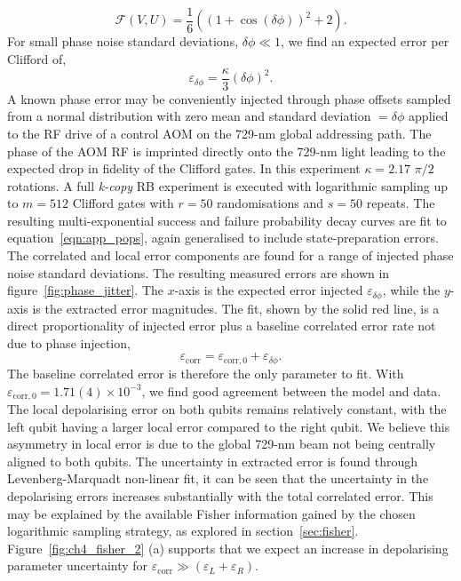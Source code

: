 \begin{equation}
    \mathcal{F}(V,U) = \frac{1}{6} \left( \left(1+\cos\left(\delta\phi\right)\right)^2 + 2 \right).
\end{equation}
For small phase noise standard deviations, $\delta\phi \ll 1$, we find an expected error per Clifford of,
\begin{equation}
\varepsilon_{\delta\phi} = \frac{\kappa}{3}(\delta\phi)^2.
\end{equation}
A known phase error may be conveniently injected through phase offsets sampled from a normal distribution with zero mean and standard deviation $=\delta\phi$ applied to the RF drive of a control AOM on the 729-nm global addressing path. The phase of the AOM RF is imprinted directly onto the 729-nm light leading to the expected drop in fidelity of the Clifford gates.
In this experiment $\kappa=2.17$ $\pi/2$ rotations. A full \emph{k-copy} RB experiment is executed with logarithmic sampling up to $m=512$ Clifford gates with $r=50$ randomisations and $s=50$ repeats. The resulting multi-exponential success and failure probability decay curves are fit to equation~\ref{eqn:app_pops}, again generalised to include state-preparation errors.  The correlated and local error components are found for a range of injected phase noise standard deviations. The resulting measured errors are shown in figure~\ref{fig:phase_jitter}. The $x$-axis is the expected error injected $\varepsilon_{\delta\phi}$, while the $y$-axis is the extracted error magnitudes. The fit, shown by the solid red line, is a direct proportionality of injected error plus a baseline correlated error rate not due to phase injection,
\begin{equation}
\varepsilon_\mathrm{corr} = \varepsilon_\mathrm{corr,0} + \varepsilon_{\delta\phi}.
\end{equation}
The baseline correlated error is therefore the only parameter to fit. With $\varepsilon_\mathrm{corr,0}= 1.71(4)\times10^{-3}$, we find good agreement between the model and data. 
The local depolarising error on both qubits remains relatively constant, with the left qubit having a larger local error compared to the right qubit. We believe this asymmetry in local error is due to the global 729-nm beam not being centrally aligned to both qubits. The uncertainty in extracted error is found through Levenberg-Marquadt non-linear fit, it can be seen that the uncertainty in the depolarising errors increases substantially with the total correlated error. This may be explained by the available Fisher information gained by the chosen logarithmic sampling strategy, as explored in section~\ref{sec:fisher}. Figure~\ref{fig:ch4_fisher_2} (a) supports that we expect an increase in depolarising parameter uncertainty for $\varepsilon_\mathrm{corr} \gg (\varepsilon_L + \varepsilon_R)$.


